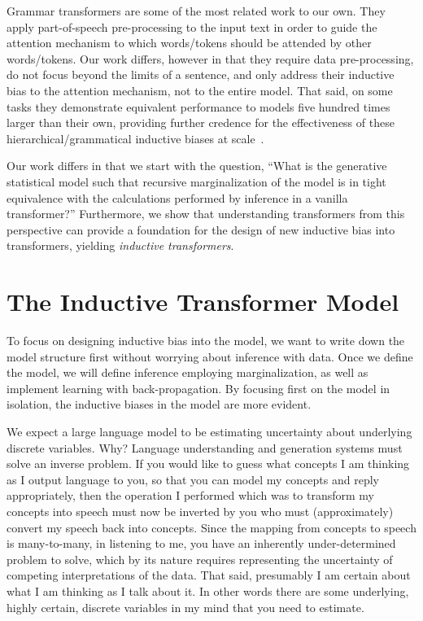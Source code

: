 \documentclass{article}
\begin{document}
Grammar transformers are some of the most related work to our own. They apply part-of-speech pre-processing to the input text in order to guide the attention mechanism to which words/tokens should be attended by other words/tokens.  Our work differs, however in that they require data pre-processing, do not focus beyond the limits of a sentence, and only address their inductive bias to the attention mechanism, not to the entire model.  That said, on some tasks they demonstrate equivalent performance to models five hundred times larger than their own, providing further credence for the effectiveness of these hierarchical/grammatical inductive biases at scale~\citep{sartran2022transformer}.

Our work differs in that we start with the question, ``What is the generative statistical model such that recursive marginalization of the model is in tight equivalence with the calculations performed by inference in a vanilla transformer?''  Furthermore, we show that understanding transformers from this perspective can provide a foundation for the design of new inductive bias into transformers, yielding \emph{inductive transformers}.

\section{The Inductive Transformer Model}\label{section:inductive-transformer-model}

To focus on designing inductive bias into the model, we want to write down the model structure first without worrying about inference with data.  Once we define the model, we will define inference employing marginalization, as well as implement learning with back-propagation.  By focusing first on the model in isolation, the inductive biases in the model are more evident.

We expect a large language model to be estimating uncertainty about underlying discrete variables.  Why? Language understanding and generation systems must solve an inverse problem.  If you would like to guess what concepts I am thinking as I output language to you, so that you can model my concepts and reply appropriately, then the operation I performed which was to transform my concepts into speech must now be inverted by you who must (approximately) convert my speech back into concepts.  Since the mapping from concepts to speech is many-to-many, in listening to me, you have an inherently under-determined problem to solve, which by its nature requires representing the uncertainty of competing interpretations of the data.  That said, presumably I am certain about what I am thinking as I talk about it. In other words there are some underlying, highly certain, discrete variables in my mind that you need to estimate.  
\end{document}
